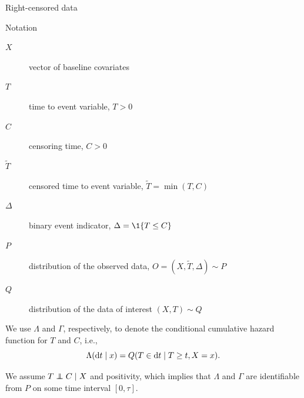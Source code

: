 \documentclass[smaller]{beamer}\usepackage{listings}
\begin{document}
\begin{frame}[label={sec:orgd57a8e1}]{Right-censored data}
\small

\begin{block}{Notation}
\begin{description}
\item[{\(X\)}] vector of baseline covariates
\item[{\(T\)}] time to event variable, \(T > 0\)
\item[{\(C\)}] censoring time, \(C > 0\)
\item[{\color{gray}\(\tilde T\)\color{black}}] censored time to event variable, \(\tilde T = \min(T, C)\)
\item[{\color{gray}\(\Delta\)\color{black}}] binary event indicator, \(\Delta =
  \1{\{T \leq C\}}\)
\item[{\color{gray}\(P\)\color{black}}] distribution of the observed data, \(O =
  (X, \tilde T, \Delta) \sim P\)
\item[{\(Q\)}] distribution of the data of interest \((X, T) \sim Q\)
\end{description}

\hfill

We use \color{bblue} \(\Lambda\) \color{black} and
\color{bblue}\(\Gamma\)\color{black}, respectively, to denote the conditional
cumulative hazard function for \(T\) and \(C\), i.e.,
\begin{equation*}
  \Lambda(\mathop{}\!\mathrm{d} t \mid x) = Q(T \in \mathop{}\!\mathrm{d} t \mid T \geq t, X=x).
\end{equation*}

We assume \(T \independent C \mid X\) and positivity, which implies that
\(\Lambda\) and \(\Gamma\) are identifiable from \(P\) on some time interval \([0,\tau]\).
\end{block}
\end{frame}
\end{document}
